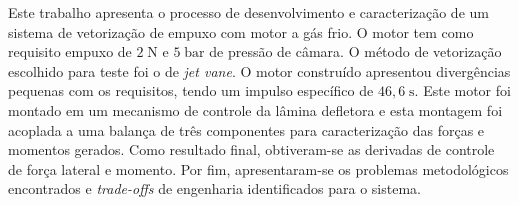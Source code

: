 Este trabalho apresenta o processo de desenvolvimento e caracterização de um sistema de vetorização de empuxo com motor a gás frio. O motor tem como requisito empuxo de \(2\;\mathrm{N}\) e \(5\;\mathrm{bar}\) de pressão de câmara. O método de vetorização escolhido para teste foi o de \textit{jet vane}. O motor construído apresentou divergências pequenas com os requisitos, tendo um impulso específico de \(46,6\;\mathrm{s}\). Este motor foi montado em um mecanismo de controle da lâmina defletora e esta montagem foi acoplada a uma balança de três componentes para caracterização das forças e momentos gerados. Como resultado final, obtiveram-se as derivadas de controle de força lateral e momento. Por fim, apresentaram-se os problemas metodológicos encontrados e \textit{trade-offs} de engenharia identificados para o sistema.